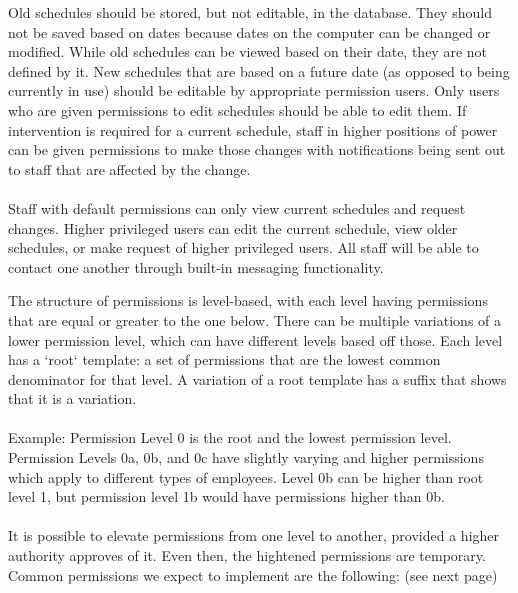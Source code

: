 \documentclass[letterpaper,12pt]{report}
\begin{document}
Old schedules should be stored, but not editable, in the database. They should not be saved based on dates because dates on the computer can be changed or modified. While old schedules can be viewed based on their date, they are not defined by it. New schedules that are based on a future date (as opposed to being currently in use) should be editable by appropriate permission users. Only users who are given permissions to edit schedules should be able to edit them. If intervention is required for a current schedule, staff in higher positions of power can be given permissions to make those changes with notifications being sent out to staff that are affected by the change.
\pagebreak
\paragraph*{}\hspace{0.6cm}Staff with default permissions can only view current schedules and request changes. Higher privileged users can edit the current schedule, view older schedules, or make request of higher privileged users. All staff will be able to contact one another through built-in messaging functionality.

The structure of permissions is level-based, with each level having permissions that are equal or greater to the one below. There can be multiple variations of a lower permission level, which can have different levels based off those. Each level has a `root` template: a set of permissions that are the lowest common denominator for that level. A variation of a root template has a suffix that shows that it is a variation.\newline 
\paragraph*{}\hspace{0.6cm} Example: Permission Level 0 is the root and the lowest permission level. Permission Levels 0a, 0b, and 0c have slightly varying and higher permissions which apply to different types of employees. Level 0b can be higher than root level 1, but permission level 1b would have permissions higher than 0b.
\paragraph*{}\hspace{0.6cm}It is possible to elevate permissions from one level to another, provided a higher authority approves of it. Even then, the hightened permissions are temporary.\newline
Common permissions we expect to implement are the following: (see next page)
\pagebreak
\end{document}
